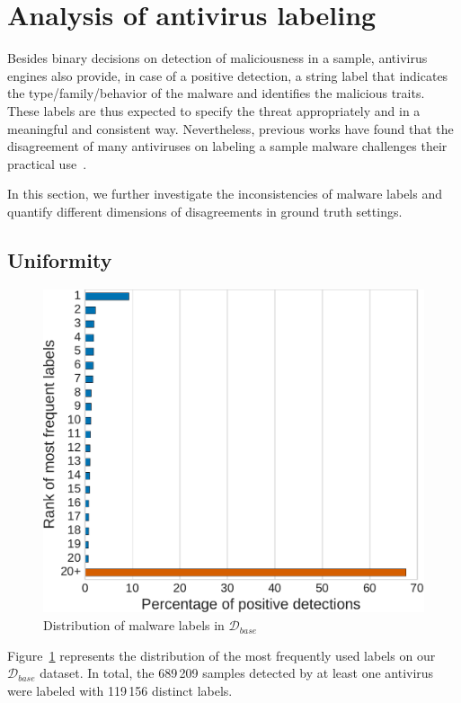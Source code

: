 \section{Analysis of antivirus labeling}
Besides binary decisions on detection of maliciousness in a sample, antivirus engines also provide, in case of a positive detection, a string label that indicates the type/family/behavior of the malware and identifies the malicious traits.
These labels are thus expected to specify the threat appropriately and in a meaningful and consistent way.
Nevertheless, previous works have found that the disagreement of many antiviruses on labeling a sample malware challenges their practical use~\cite{kruegel_automated_2007,canto_large_2017,jajodia_finding_2011,hutchison_av-meter:_2014}.

In this section, we further investigate the inconsistencies of malware labels and quantify different dimensions of disagreements in ground truth settings.
\subsection{Uniformity}

\begin{figure}[!ht]
        \centering
	\includegraphics[width=0.75\linewidth]{figures/stase/uniformity.pdf}
        \caption[Distribution of malware labels]{Distribution of malware labels in $\mathcal{D}_{base}$}
	\label{figure:stase:uniformity}
\end{figure}

Figure~\ref{figure:stase:uniformity} represents the distribution of the most frequently used labels on our $\mathcal{D}_{base}$ dataset.
In total, the 689\,209 samples detected by at least one antivirus were labeled with 119\,156 distinct labels.

